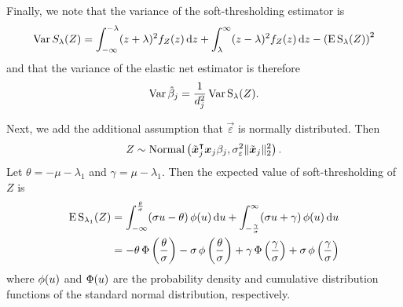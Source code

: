 Finally, we note that the variance of the soft-thresholding estimator is
\begin{equation}
  \label{eq:st-variance}
  \operatorname{Var} {S_\lambda(Z)} = \int_{-\infty}^{-\lambda}(z + \lambda)^2f_Z(z) \mathop{}\!\mathrm{d} z + \int_{\lambda}^\infty (z - \lambda)^2 f_Z(z) \mathop{}\!\mathrm{d} z - \left(\operatorname{E} \operatorname{S}_\lambda(Z)\right)^2
\end{equation}
and that the variance of the elastic net estimator is therefore
\begin{equation}
  \label{eq:betahat-variance}
  \operatorname{Var} \hat\beta_j = \frac{1}{d_j^2} \operatorname{Var} \operatorname{S}_\lambda(Z).
\end{equation}


Next, we add the additional assumption that \(\vec{\varepsilon}\) is normally distributed. Then
\[
  Z \sim \operatorname{Normal}\left(\tilde{\boldsymbol{x}}_j^\intercal\boldsymbol{x}_j \beta_j, \sigma_\varepsilon^2 \lVert \tilde{\boldsymbol{x}}_j\rVert_2^2 \right).
\]
Let \(\theta = -\mu -\lambda_1 \) and \(\gamma = \mu - \lambda_1\). Then the expected value of soft-thresholding of \(Z\) is
\begin{align}
  \operatorname{E} \operatorname{S}_{\lambda_1}(Z) & = \int_{-\infty}^\frac{\theta}{\sigma} (\sigma u - \theta) \operatorname{\phi}(u) \mathop{}\!\mathrm{d} u + \int_{-\frac{\gamma}{\sigma}}^\infty (\sigma u + \gamma) \operatorname{\phi}(u) \mathop{}\!\mathrm{d} u                                               \nonumber                      \\
                        & = -\theta \operatorname{\Phi}\left(\frac{\theta}{\sigma}\right) - \sigma \operatorname{\phi}\left(\frac{\theta}{\sigma}\right) + \gamma \operatorname{\Phi}\left(\frac{\gamma}{\sigma}\right) + \sigma \operatorname{\phi}\left(\frac{\gamma}{\sigma}\right) \label{eq:mean-centered-eval}
\end{align}
where \(\operatorname{\phi}(u)\) and \(\operatorname{\Phi}(u)\) are the probability density and cumulative distribution functions of the standard normal distribution, respectively.

